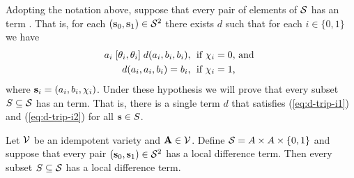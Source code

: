 Adopting the notation above, suppose that every pair
of elements of $\mathcal{S}$ has an \ld term .
That is, for each $(\mathbf{s}_0, \mathbf{s}_1)\in \mathcal{S}^2$ there exists
$d$ such that for each $i \in \{0,1\}$ we have
\begin{align}
  a_i \comr{\theta_i} d(a_i,b_i,b_i), & \;
  \text{ if $\chi_i=0$, and }  \label{eq:d-trip-i1}\\
  d(a_i,a_i,b_i) =b_i, & \;
  \text{ if $\chi_i=1$,}\label{eq:d-trip-i2} %
\end{align}
where $\mathbf{s}_i = (a_i, b_i, \chi_i)$.
Under these hypothesis we will prove that every subset $S\subseteq \mathcal{S}$
has an \ld term.
That is, there is a single term $d$ that satisfies
(\ref{eq:d-trip-i1}) and (\ref{eq:d-trip-i2}) for all $\mathbf{s} \in S$.

\begin{theorem} %
  \label{thm:local-diff-terms}
  Let $\mathcal{V}$ be an idempotent variety and
  $\mathbf{A} \in \mathcal{V}$. Define
  $\mathcal{S}= A \times A \times \{0,1\}$
  and suppose that every pair
  $(\mathbf{s}_0, \mathbf{s}_1) \in \mathcal{S}^2$
  has a local difference term.
  Then every subset $S \subseteq \mathcal{S}$
  has a local difference term.
\end{theorem}

